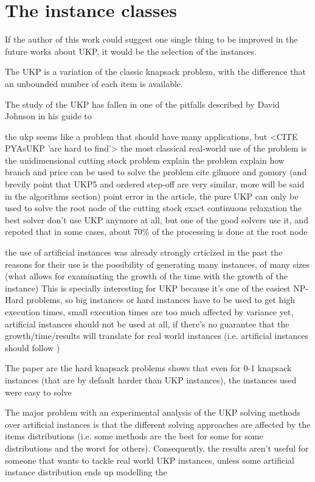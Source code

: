 \chapter{The instance classes}

If the author of this work could suggest one single thing to be improved in the future works about UKP, it would be the selection of the instances.

The UKP is a variation of the classic knapsack problem, with the difference that an unbounded number of each item is available.

The study of the UKP has fallen in one of the pitfalls described by David Johnson in his guide to 

the ukp seems like a problem that should have many applications, but <CITE PYAsUKP 'are hard to find'>
the most classical real-world use of the problem is the unidimensional cutting stock problem 
	explain the problem
	explain how branch and price can be used to solve the problem
	cite gilmore and gomory (and brevily point that UKP5 and ordered step-off are very similar, more will be said in the algorithms section)
point error in the article, the pure UKP can only be used to solve the root node of the cutting stock exact continuous relaxation
the best solver don't use UKP anymore at all, but one of the good solvers use it, and repoted that in some cases, about 70\% of the processing is done at the root node

the use of artificial instances was already strongly crticized in the past
the reasons for their use is the possibility of generating many instances, of many sizes (what allows for examinating the growth of the time with the growth of the instance)
	This is specially interesting for UKP because it's one of the easiest NP-Hard problems, so big instances or hard instances have to be used to get high execution times, small execution times are too much affected by variance
	yet, artificial instances should not be used at all, if there's no guarantee that the growth/time/results will translate for real world instances (i.e. artificial instances should follow )

	The paper are the hard knapsack problems shows that even for 0-1 knapsack instances (that are by default harder than UKP instances), the instances used were easy to solve


The major problem with an experimental analysis of the UKP solving methods over artificial instances is that the different solving approaches are affected by the items distributions (i.e. some methods are the best for some for some distributions and the worst for others). Consequently, the results aren't useful for someone that wants to tackle real world UKP instances, unless some artificial instance distribution ends up modelling the 

